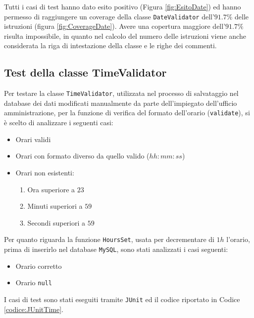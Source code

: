 
\noindent
Tutti i casi di test hanno dato esito positivo (Figura \ref{fig:EsitoDate}) ed hanno permesso di raggiungere un coverage della classe \verb|DateValidator| dell'$91.7\%$ delle istruzioni (figura \ref{fig:CoverageDate}). Avere una copertura maggiore dell'$91.7\%$ risulta impossibile, in quanto nel calcolo del numero delle istruzioni viene anche considerata la riga di intestazione della classe e le righe dei commenti.
\subsection{Test della classe TimeValidator}
Per testare la classe \verb|TimeValidator|, utilizzata nel processo di salvataggio nel database dei dati modificati manualmente da parte dell'impiegato dell'ufficio amministrazione, per la funzione di verifica del formato dell'orario (\verb|validate|), si è scelto di analizzare i seguenti casi:
\begin{itemize}
	\item Orari validi
	\item Orari con formato diverso da quello valido ($hh:mm:ss$)
	\item Orari non esistenti:
		\begin{enumerate}
			\item Ora superiore a $23$
			\item Minuti superiori a $59$
			\item Secondi superiori a $59$
		\end{enumerate}
\end{itemize}
Per quanto riguarda la funzione \verb|HoursSet|, usata per decrementare di $1h$ l'orario, prima di inserirlo nel database \verb|MySQL|, sono stati analizzati i casi seguenti:
\begin{itemize}
	\item Orario corretto
	\item Orario \verb|null|
\end{itemize}
I casi di test sono stati eseguiti tramite \verb|JUnit| ed il codice riportato in Codice \ref{codice:JUnitTime}.

\lstset{
    caption=Casi JUnit per il test della classe TimeValidator,
    label=codice:JUnitTime,
 }


